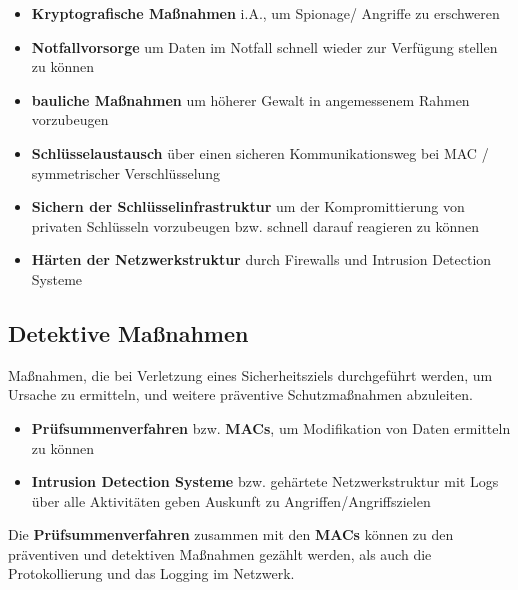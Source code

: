\begin{itemize}
    \itemsep0.5em
    \item \textbf{Kryptografische Maßnahmen} i.A., um Spionage/ Angriffe zu erschweren
    \item \textbf{Notfallvorsorge} um Daten im Notfall schnell wieder zur Verfügung stellen zu können
    \item \textbf{bauliche Maßnahmen} um höherer Gewalt in angemessenem Rahmen vorzubeugen
    \item \textbf{Schlüsselaustausch} über einen sicheren Kommunikationsweg bei MAC / symmetrischer Verschlüsselung
    \item \textbf{Sichern der Schlüsselinfrastruktur} um der Kompromittierung von privaten Schlüsseln vorzubeugen bzw. schnell darauf reagieren zu können
    \item \textbf{Härten der Netzwerkstruktur} durch Firewalls und Intrusion Detection Systeme
\end{itemize}

\subsection*{Detektive Maßnahmen}

Maßnahmen, die bei Verletzung eines Sicherheitsziels durchgeführt werden, um Ursache zu ermitteln, und weitere präventive Schutzmaßnahmen abzuleiten.

\begin{itemize}
    \item \textbf{Prüfsummenverfahren} bzw. \textbf{MACs}, um Modifikation von Daten ermitteln zu können
    \item \textbf{Intrusion Detection Systeme} bzw. gehärtete Netzwerkstruktur mit Logs über alle Aktivitäten geben Auskunft zu Angriffen/Angriffszielen
\end{itemize}

\noindent
Die \textbf{Prüfsummenverfahren} zusammen mit den \textbf{MACs} können zu den präventiven und detektiven Maßnahmen gezählt werden, als auch die Protokollierung und das Logging im Netzwerk.